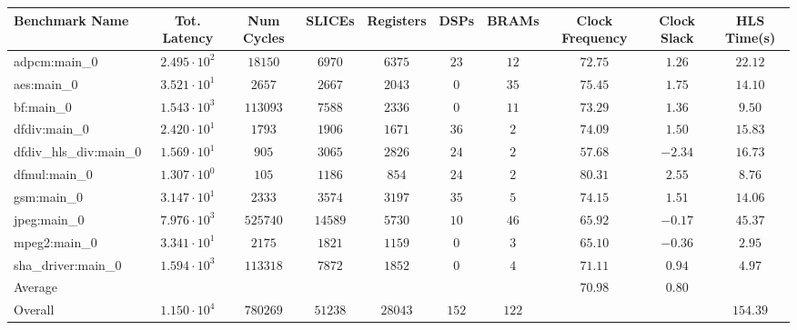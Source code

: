 \begin{tabular}{|l|c|c|c|c|c|c|c|c|c|}
\hline
Benchmark Name          & Tot. Latency           & Num Cycles & SLICEs    & Registers & DSPs    & BRAMs   & Clock Frequency & Clock Slack & HLS Time(s) \\
\hline
adpcm:main\_0           & $ 2.495 \cdot 10^{2} $ & $ 18150  $ & $ 6970  $ & $ 6375  $ & $ 23  $ & $ 12  $ & $ 72.75       $ & $ 1.26    $ & $ 22.12   $ \\
aes:main\_0             & $ 3.521 \cdot 10^{1} $ & $ 2657   $ & $ 2667  $ & $ 2043  $ & $ 0   $ & $ 35  $ & $ 75.45       $ & $ 1.75    $ & $ 14.10   $ \\
bf:main\_0              & $ 1.543 \cdot 10^{3} $ & $ 113093 $ & $ 7588  $ & $ 2336  $ & $ 0   $ & $ 11  $ & $ 73.29       $ & $ 1.36    $ & $ 9.50    $ \\
dfdiv:main\_0           & $ 2.420 \cdot 10^{1} $ & $ 1793   $ & $ 1906  $ & $ 1671  $ & $ 36  $ & $ 2   $ & $ 74.09       $ & $ 1.50    $ & $ 15.83   $ \\
dfdiv\_hls\_div:main\_0 & $ 1.569 \cdot 10^{1} $ & $ 905    $ & $ 3065  $ & $ 2826  $ & $ 24  $ & $ 2   $ & $ 57.68       $ & $ -2.34   $ & $ 16.73   $ \\
dfmul:main\_0           & $ 1.307 \cdot 10^{0} $ & $ 105    $ & $ 1186  $ & $ 854   $ & $ 24  $ & $ 2   $ & $ 80.31       $ & $ 2.55    $ & $ 8.76    $ \\
gsm:main\_0             & $ 3.147 \cdot 10^{1} $ & $ 2333   $ & $ 3574  $ & $ 3197  $ & $ 35  $ & $ 5   $ & $ 74.15       $ & $ 1.51    $ & $ 14.06   $ \\
jpeg:main\_0            & $ 7.976 \cdot 10^{3} $ & $ 525740 $ & $ 14589 $ & $ 5730  $ & $ 10  $ & $ 46  $ & $ 65.92       $ & $ -0.17   $ & $ 45.37   $ \\
mpeg2:main\_0           & $ 3.341 \cdot 10^{1} $ & $ 2175   $ & $ 1821  $ & $ 1159  $ & $ 0   $ & $ 3   $ & $ 65.10       $ & $ -0.36   $ & $ 2.95    $ \\
sha\_driver:main\_0     & $ 1.594 \cdot 10^{3} $ & $ 113318 $ & $ 7872  $ & $ 1852  $ & $ 0   $ & $ 4   $ & $ 71.11       $ & $ 0.94    $ & $ 4.97    $ \\
\hline
Average                 & $                    $ & $        $ & $       $ & $       $ & $     $ & $     $ & $ 70.98       $ & $ 0.80    $ & $         $ \\
\hline
Overall                 & $ 1.150 \cdot 10^{4} $ & $ 780269 $ & $ 51238 $ & $ 28043 $ & $ 152 $ & $ 122 $ & $             $ & $         $ & $ 154.39  $ \\
\hline
\end{tabular}
